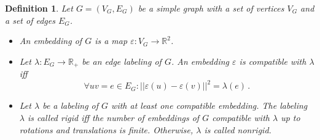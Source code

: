 \documentclass[a1paper, portrait,innermargin=10mm, blockverticalspace=10mm, colspace=10mm,margin=0mm,]{tikzposter} %
\newtheorem{defn}{Definition}
\newcommand{\RR}{\mathbb{R}}
\begin{document}
\begin{columns}
{\begin{defn}
Let $G=(V_G,E_G)$ be a simple graph with a set of vertices $V_G$ and a set of edges $E_G$. 
\begin{itemize}
	\item An \emph{embedding} of $G$ is a map $\varepsilon:V_G\rightarrow \RR^2$. 
	\item  Let $\lambda:E_G\rightarrow \RR_+$ be an edge labeling of $G$. An embedding $\varepsilon$ is \emph{compatible with} $\lambda$ iff  $$\forall uv=e\in E_G \colon ||\varepsilon(u)-\varepsilon(v)||^2=\lambda(e)\,.$$
	\item Let $\lambda$ be a labeling of $G$ with at least one compatible embedding. The labeling $\lambda$ is called \emph{rigid} iff the number of embeddings of $G$ compatible with $\lambda$ up to rotations and translations is finite. Otherwise,  $\lambda$ is called \emph{nonrigid}.
\end{itemize} 
\end{defn}


}
\end{columns}
\end{document}
